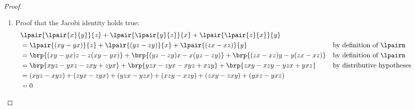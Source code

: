 \begin{proof}
\begin{enumerate}
  \item Proof that the Jacobi identity holds true:
    \begin{align*}
      &\lpair{\lpair{x}{y}}{z} + \lpair{\lpair{y}{z}}{x} + \lpair{\lpair{z}{x}}{y}
      \\&= \lpair{(xy-yx)}{z} + \lpair{(yz-zy)}{x} + \lpair{(zx-xz)}{y}
        && \text{by definition of $\lpairn$}
      \\&= \brp{(xy-yx)z-z(xy-yx)} + \brp{(yz-zy)x-x(yz-zy)} + \brp{(zx-xz)y-y(zx-xz)}
        && \text{by definition of $\lpairn$}
      \\&= \brp{xyz-yxz-zxy+zyx} + \brp{yzx-zyx-xyz+xzy} + \brp{zxy-xzy-yzx+yxz}
        && \text{by distributive hypotheses}
      \\&= (xyz-xyz)+(zyx-zyx) + (yzx-yzx)+(xzy-xzy) + (zxy-zxy)+(yxz-yxz)
      \\&= 0
    \end{align*}
  \end{enumerate}
\end{proof}

